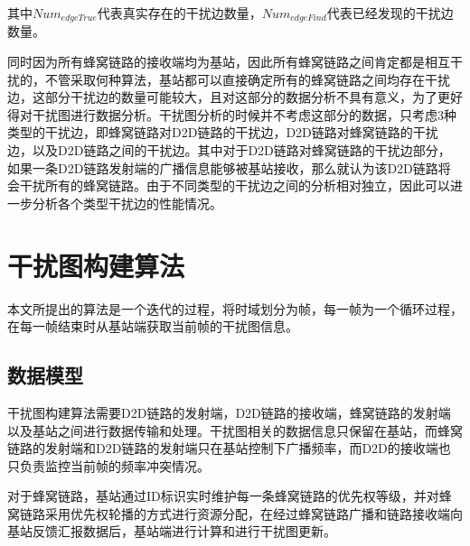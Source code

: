 \documentclass[figurelist,tablelist,algorithmlist,nomlist,masters]{seuthesix}
\begin{document}
	其中$Nu{m_{edgeTrue}}$代表真实存在的干扰边数量，$Nu{m_{edgeFind}}$代表已经发现的干扰边数量。
	
	同时因为所有蜂窝链路的接收端均为基站，因此所有蜂窝链路之间肯定都是相互干扰的，不管采取何种算法，基站都可以直接确定所有的蜂窝链路之间均存在干扰边，这部分干扰边的数量可能较大，且对这部分的数据分析不具有意义，为了更好得对干扰图进行数据分析。干扰图分析的时候并不考虑这部分的数据，只考虑3种类型的干扰边，即蜂窝链路对D2D链路的干扰边，D2D链路对蜂窝链路的干扰边，以及D2D链路之间的干扰边。其中对于D2D链路对蜂窝链路的干扰边部分，如果一条D2D链路发射端的广播信息能够被基站接收，那么就认为该D2D链路将会干扰所有的蜂窝链路。由于不同类型的干扰边之间的分析相对独立，因此可以进一步分析各个类型干扰边的性能情况。
	
	\section{干扰图构建算法}
	本文所提出的算法是一个迭代的过程，将时域划分为帧，每一帧为一个循环过程，在每一帧结束时从基站端获取当前帧的干扰图信息。
	
	\subsection{数据模型}
	干扰图构建算法需要D2D链路的发射端，D2D链路的接收端，蜂窝链路的发射端以及基站之间进行数据传输和处理。干扰图相关的数据信息只保留在基站，而蜂窝链路的发射端和D2D链路的发射端只在基站控制下广播频率，而D2D的接收端也只负责监控当前帧的频率冲突情况。
	
	对于蜂窝链路，基站通过ID标识实时维护每一条蜂窝链路的优先权等级，并对蜂窝链路采用优先权轮播的方式进行资源分配，在经过蜂窝链路广播和链路接收端向基站反馈汇报数据后，基站端进行计算和进行干扰图更新。
	
\end{document}
